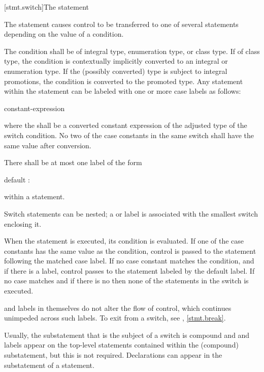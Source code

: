[stmt.switch]{The  statement}%

\pnum
The  statement causes control to be transferred to one of
several statements depending on the value of a condition.

\pnum
The condition shall be of integral type, enumeration type, or class
type. If of class type, the
condition is contextually implicitly converted to
an integral or enumeration type.
If the (possibly converted) type is subject to integral
promotions, the condition is converted
to the promoted type.
Any
statement within the  statement can be labeled with one or
more case labels as follows:

\begin{ncbnf}
%
 constant-expression \terminal{:}
\end{ncbnf}

where the  shall be
a converted constant expression of the
adjusted type of the switch condition. No two of the case constants in
the same switch shall have the same value after conversion.

\pnum
{}%
There shall be at most one label of the form

\begin{codeblock}
default :
\end{codeblock}

within a  statement.

\pnum
Switch statements can be nested; a  or  label
is associated with the smallest switch enclosing it.

\pnum
When the  statement is executed, its condition is
evaluated.
%
If one of the case constants has the same value as the condition,
control is passed to the statement following the matched case label. If
no case constant matches the condition, and if there is a
%
 label, control passes to the statement labeled by the
default label. If no case matches and if there is no 
then none of the statements in the switch is executed.

\pnum
{} and  labels in themselves do not alter the
flow of control, which continues unimpeded across such labels. To exit
from a switch, see , \ref{stmt.break}.
\begin{note}
Usually, the substatement that is the subject of a switch is compound
and  and  labels appear on the top-level
statements contained within the (compound) substatement, but this is not
required.
%
Declarations can appear in the substatement of a
 statement.
\end{note}

